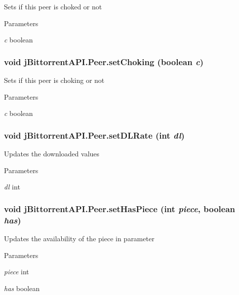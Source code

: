 \label{classj_bittorrent_a_p_i_1_1_peer_abaafe98ab9364cd5f97bf44845ffe547}
Sets if this peer is choked or not 
\begin{DoxyParams}{Parameters}
\item[{\em c}]boolean \end{DoxyParams}
\hypertarget{classj_bittorrent_a_p_i_1_1_peer_a80ca94e6613a57e26cb8d492f527b655}{
\subsubsection[{setChoking}]{\setlength{\rightskip}{0pt plus 5cm}void jBittorrentAPI.Peer.setChoking (boolean {\em c})}}
\label{classj_bittorrent_a_p_i_1_1_peer_a80ca94e6613a57e26cb8d492f527b655}
Sets if this peer is choking or not 
\begin{DoxyParams}{Parameters}
\item[{\em c}]boolean \end{DoxyParams}
\hypertarget{classj_bittorrent_a_p_i_1_1_peer_ab7e729e31a066939ffe067dbe6f5c7f0}{
\subsubsection[{setDLRate}]{\setlength{\rightskip}{0pt plus 5cm}void jBittorrentAPI.Peer.setDLRate (int {\em dl})}}
\label{classj_bittorrent_a_p_i_1_1_peer_ab7e729e31a066939ffe067dbe6f5c7f0}
Updates the downloaded values 
\begin{DoxyParams}{Parameters}
\item[{\em dl}]int \end{DoxyParams}
\hypertarget{classj_bittorrent_a_p_i_1_1_peer_ab3aed195d88ad4569f531bd64491b000}{
\subsubsection[{setHasPiece}]{\setlength{\rightskip}{0pt plus 5cm}void jBittorrentAPI.Peer.setHasPiece (int {\em piece}, \/  boolean {\em has})}}
\label{classj_bittorrent_a_p_i_1_1_peer_ab3aed195d88ad4569f531bd64491b000}
Updates the availability of the piece in parameter 
\begin{DoxyParams}{Parameters}
\item[{\em piece}]int \item[{\em has}]boolean \end{DoxyParams}
